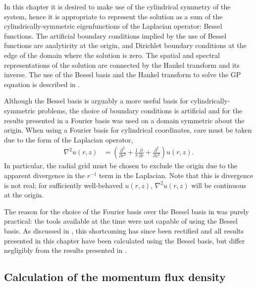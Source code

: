 In this chapter it is desired to make use of the cylindrical symmetry of the system, hence it is appropriate to represent the solution as a sum of the cylindrically-symmetric eigenfunctions of the Laplacian operator: Bessel functions. The artificial boundary conditions implied by the use of Bessel functions are analyticity at the origin, and Dirichlet boundary conditions at the edge of the domain where the solution is zero. The spatial and spectral representations of the solution are connected by the Hankel transform \citep[Chapter 15]{ArfkenWeber} and its inverse. The use of the Bessel basis and the Hankel transform to solve the GP equation is described in \citep{Ronen:2006}.

Although the Bessel basis is arguably a more useful basis for cylindrically-symmetric problems, the choice of boundary conditions is artificial and for the results presented in \citep{Dall:2009} a Fourier basis was used on a domain symmetric about the origin. When using a Fourier basis for cylindrical coordinates, care must be taken due to the form of the Laplacian operator,
\begin{align}
    \nabla^2 u(r, z) &= \left(\frac{\partial^2 }{\partial r^2} + \frac{1}{r}\frac{\partial }{\partial r} + \frac{\partial^2 }{\partial z^2}\right)u(r, z).
\end{align}
In particular, the radial grid must be chosen to exclude the origin due to the apparent divergence in the $r^{-1}$ term in the Laplacian. Note that this is divergence is not real; for sufficiently well-behaved $u(r, z)$, $\nabla^2 u(r, z)$ will be continuous at the origin.

The reason for the choice of the Fourier basis over the Bessel basis in \citep{Dall:2009} was purely practical: the tools available at the time were not capable of using the Bessel basis. As discussed in , this shortcoming has since been rectified and all results presented in this chapter have been calculated using the Bessel basis, but differ negligibly from the results presented in \citep{Dall:2009}.

\subsection{Calculation of the momentum flux density}
\label{Peaks:AbsorbingBoundaryTricks}

